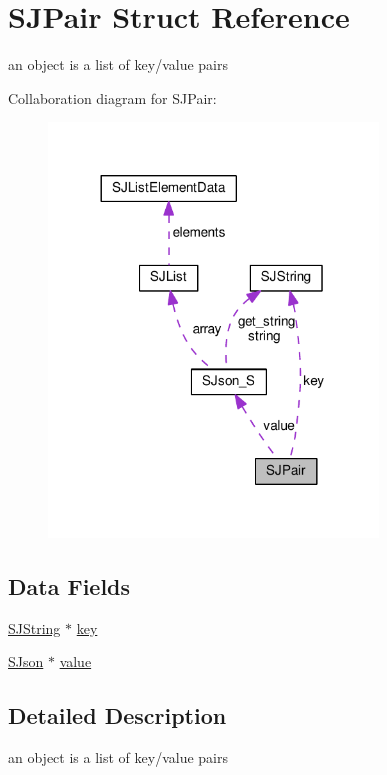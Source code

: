 \hypertarget{structSJPair}{}\section{S\+J\+Pair Struct Reference}
\label{structSJPair}


an object is a list of key/value pairs  




Collaboration diagram for S\+J\+Pair\+:
\nopagebreak
\begin{figure}[H]
\begin{center}
\leavevmode
\includegraphics[width=248pt]{d7/d37/structSJPair__coll__graph}
\end{center}
\end{figure}
\subsection*{Data Fields}
\begin{DoxyCompactItemize}
\item 
\hyperlink{structSJString}{S\+J\+String} $\ast$ \hyperlink{structSJPair_a23681f167b9eac4d55be408c2007ae6c}{key}
\item 
\hyperlink{structSJson__S}{S\+Json} $\ast$ \hyperlink{structSJPair_aeee74c0e0e05940043b8aa96d1be43a4}{value}
\end{DoxyCompactItemize}


\subsection{Detailed Description}
an object is a list of key/value pairs 

